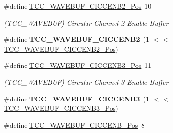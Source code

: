 \begin{DoxyCompactItemize}
\item 
\hypertarget{group___s_a_m_l21___t_c_c_ga0168daf212c9e4683caf8a12a0928684}{}\#define \hyperlink{group___s_a_m_l21___t_c_c_ga0168daf212c9e4683caf8a12a0928684}{T\+C\+C\+\_\+\+W\+A\+V\+E\+B\+U\+F\+\_\+\+C\+I\+C\+C\+E\+N\+B2\+\_\+\+Pos}~10\label{group___s_a_m_l21___t_c_c_ga0168daf212c9e4683caf8a12a0928684}

\begin{DoxyCompactList}\small\item\em (T\+C\+C\+\_\+\+W\+A\+V\+E\+B\+U\+F) Circular Channel 2 Enable Buffer \end{DoxyCompactList}\item 
\hypertarget{group___s_a_m_l21___t_c_c_ga49cf2bc4f3c7dd86a5eeaf6b241667c9}{}\#define {\bfseries T\+C\+C\+\_\+\+W\+A\+V\+E\+B\+U\+F\+\_\+\+C\+I\+C\+C\+E\+N\+B2}~(1 $<$$<$ \hyperlink{group___s_a_m_l21___t_c_c_ga0168daf212c9e4683caf8a12a0928684}{T\+C\+C\+\_\+\+W\+A\+V\+E\+B\+U\+F\+\_\+\+C\+I\+C\+C\+E\+N\+B2\+\_\+\+Pos})\label{group___s_a_m_l21___t_c_c_ga49cf2bc4f3c7dd86a5eeaf6b241667c9}

\item 
\hypertarget{group___s_a_m_l21___t_c_c_ga2456f1e44ccb643f6931493a461d5185}{}\#define \hyperlink{group___s_a_m_l21___t_c_c_ga2456f1e44ccb643f6931493a461d5185}{T\+C\+C\+\_\+\+W\+A\+V\+E\+B\+U\+F\+\_\+\+C\+I\+C\+C\+E\+N\+B3\+\_\+\+Pos}~11\label{group___s_a_m_l21___t_c_c_ga2456f1e44ccb643f6931493a461d5185}

\begin{DoxyCompactList}\small\item\em (T\+C\+C\+\_\+\+W\+A\+V\+E\+B\+U\+F) Circular Channel 3 Enable Buffer \end{DoxyCompactList}\item 
\hypertarget{group___s_a_m_l21___t_c_c_ga1714a21c57a2c5810291d8b52490916a}{}\#define {\bfseries T\+C\+C\+\_\+\+W\+A\+V\+E\+B\+U\+F\+\_\+\+C\+I\+C\+C\+E\+N\+B3}~(1 $<$$<$ \hyperlink{group___s_a_m_l21___t_c_c_ga2456f1e44ccb643f6931493a461d5185}{T\+C\+C\+\_\+\+W\+A\+V\+E\+B\+U\+F\+\_\+\+C\+I\+C\+C\+E\+N\+B3\+\_\+\+Pos})\label{group___s_a_m_l21___t_c_c_ga1714a21c57a2c5810291d8b52490916a}

\item 
\hypertarget{group___s_a_m_l21___t_c_c_gaf4f390457af0268b79c515d96f29ddad}{}\#define \hyperlink{group___s_a_m_l21___t_c_c_gaf4f390457af0268b79c515d96f29ddad}{T\+C\+C\+\_\+\+W\+A\+V\+E\+B\+U\+F\+\_\+\+C\+I\+C\+C\+E\+N\+B\+\_\+\+Pos}~8\label{group___s_a_m_l21___t_c_c_gaf4f390457af0268b79c515d96f29ddad}


\end{DoxyCompactItemize}
